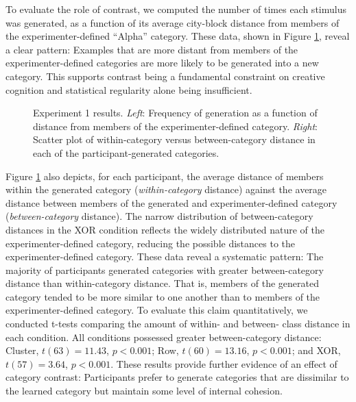 \documentclass[12pt]{article}
\newcommand\inputpgf[2]{{
\let\pgfimageWithoutPath\pgfimage
\renewcommand{\pgfimage}[2][]{\pgfimageWithoutPath[##1]{#1/##2}}

}}
\begin{document}
\begin{flushleft}
To evaluate the role of contrast, we computed the number of times each stimulus was generated, as a function of its average city-block distance from members of the experimenter-defined ``Alpha'' category. These data, shown in Figure \ref{fig:e1-distanceplots}, reveal a clear pattern: Examples that are more distant from members of the experimenter-defined categories are more likely to be generated into a new category. This supports contrast being a fundamental constraint on creative cognition and statistical regularity alone being insufficient.

\begin{figure}
    \begin{center}
    \inputpgf{figs/}{e1-distanceplots.pgf}
    \caption{Experiment 1 results. {\em Left}: Frequency of generation as a function of distance from members of the experimenter-defined category. {\em Right}: Scatter plot of within-category versus between-category distance in each of the participant-generated categories.}
    \label{fig:e1-distanceplots}
    \end{center}
\end{figure}


Figure \ref{fig:e1-distanceplots} also depicts, for each participant, the average distance of members within the generated category ({\em within-category} distance) against the average distance between members of the generated and experimenter-defined category ({\em between-category} distance). The narrow distribution of between-category distances in the XOR condition reflects the widely distributed nature of the experimenter-defined category, reducing the possible distances to the experimenter-defined category. These data reveal a systematic pattern: The majority of participants generated categories with greater between-category distance than within-category distance. That is, members of the generated category tended to be more similar to one another than to members of the experimenter-defined category. To evaluate this claim quantitatively, we conducted t-tests comparing the amount of within- and between- class distance in each condition. All conditions possessed greater between-category distance: Cluster, $t(63) = 11.43$, $p < 0.001$; Row, $t(60) = 13.16$, $p < 0.001$; and XOR, $t(57) = 3.64$, $p < 0.001$.  These results provide further evidence of an effect of category contrast: Participants prefer to generate categories that are dissimilar to the learned category but maintain some level of internal cohesion. 


\end{flushleft}
\end{document}
